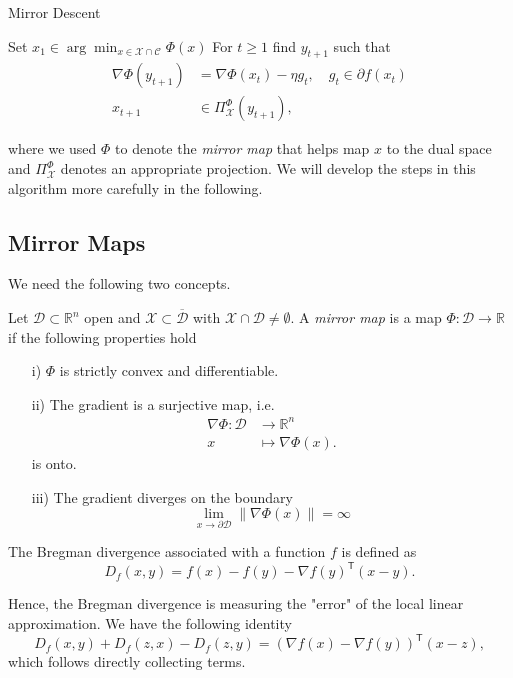 \begin{algorithm} \label{alg:mirror_descent}
\caption{Mirror Descent}
\label{alg:mirror_descent}
\begin{algorithmic}
\STATE Set $x_1 \in \arg \min_{x\in \mathcal{X}\cap\mathcal{C} }\Phi(x)$
\STATE For $t \geq 1$ find $y_{t+1}$ such that
\begin{align*}
	\nabla\Phi(y_{t+1}) &= \nabla\Phi(x_t)-\eta g_t,\quad g_t \in \partial f(x_t) \\
	x_{t+1} & \in \Pi_\mathcal{X}^\Phi(y_{t+1}),
\end{align*}
\end{algorithmic}
\end{algorithm}
where we used $\Phi$ to denote the \emph{mirror map} that helps map $x$ to the dual space and $\Pi_\mathcal{X}^\Phi$ denotes an appropriate projection. We will develop the steps in this algorithm more carefully in the following.


\subsection{Mirror Maps}
We need the following two concepts.


\begin{definition}
Let $\mathcal{D}\subset \mathbb{R}^n$ open and $\mathcal{X}\subset \overline{\mathcal{D}}$ with $\mathcal{X}\cap \mathcal{D}\neq \emptyset$. A \emph{mirror map} is a map $\Phi \colon \mathcal{D} \rightarrow \mathbb{R}$ if the following properties hold
\begin{itemize}
	\item[i)] $\Phi$ is strictly convex and differentiable.
	\item[ii)] The gradient is a surjective map, i.e.
	\begin{align*}
	\nabla \Phi \colon \mathcal{D} &\rightarrow \mathbb{R}^n\\
			x	&\mapsto \nabla\Phi(x).
	\end{align*} 
	is onto.
	\item[iii)] The gradient diverges on the boundary
	\begin{equation*}
		\lim_{x \rightarrow \partial \mathcal{D}} \left\|\nabla \Phi(x) \right\| = \infty
	\end{equation*}
\end{itemize}
\end{definition}
\begin{definition}
The Bregman divergence associated with a function $f$ is defined as 
\begin{equation*}
	D_f(x, y) = f(x) - f(y) - \nabla f(y)^\mathsf{T}(x - y).
\end{equation*} 
\end{definition}
Hence, the Bregman divergence is measuring the "error" of the local linear approximation. We have the following identity
\begin{equation}\label{eq:bergman_ident}
	D_f(x,y) + D_f(z,x) - D_f(z, y) = \left(\nabla f(x) - \nabla f(y)\right)^\mathsf{T}\left(x - z\right),
\end{equation}
which follows directly collecting terms.


